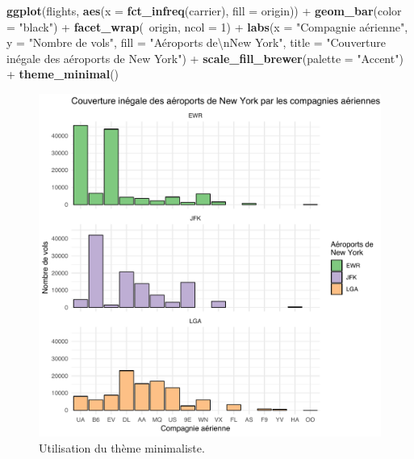 \documentclass[
  a4paper,
]{article}
\newenvironment{Shaded}{\begin{snugshade}}{\end{snugshade}}
\newcommand{\CharTok}[1]{\textcolor[rgb]{0.57,0.30,0.62}{#1}}
\newcommand{\DataTypeTok}[1]{\textcolor[rgb]{0.00,0.34,0.68}{#1}}
\newcommand{\DecValTok}[1]{\textcolor[rgb]{0.69,0.50,0.00}{#1}}
\newcommand{\KeywordTok}[1]{\textcolor[rgb]{0.12,0.11,0.11}{\textbf{#1}}}
\newcommand{\NormalTok}[1]{\textcolor[rgb]{0.12,0.11,0.11}{#1}}
\newcommand{\OperatorTok}[1]{\textcolor[rgb]{0.12,0.11,0.11}{#1}}
\newcommand{\StringTok}[1]{\textcolor[rgb]{0.75,0.01,0.01}{#1}}
\begin{document}
\begin{Shaded}
\begin{Highlighting}[]
\KeywordTok{ggplot}\NormalTok{(flights, }\KeywordTok{aes}\NormalTok{(}\DataTypeTok{x =} \KeywordTok{fct_infreq}\NormalTok{(carrier), }\DataTypeTok{fill =}\NormalTok{ origin)) }\OperatorTok{+}
\StringTok{  }\KeywordTok{geom_bar}\NormalTok{(}\DataTypeTok{color =} \StringTok{"black"}\NormalTok{) }\OperatorTok{+}
\StringTok{  }\KeywordTok{facet_wrap}\NormalTok{(}\OperatorTok{~}\NormalTok{origin, }\DataTypeTok{ncol =} \DecValTok{1}\NormalTok{) }\OperatorTok{+}
\StringTok{  }\KeywordTok{labs}\NormalTok{(}\DataTypeTok{x =} \StringTok{"Compagnie aérienne"}\NormalTok{,}
       \DataTypeTok{y =} \StringTok{"Nombre de vols"}\NormalTok{,}
       \DataTypeTok{fill =} \StringTok{"Aéroports de}\CharTok{\textbackslash{}n}\StringTok{New York"}\NormalTok{,}
       \DataTypeTok{title =} \StringTok{"Couverture inégale des aéroports de New York"}\NormalTok{) }\OperatorTok{+}
\StringTok{  }\KeywordTok{scale_fill_brewer}\NormalTok{(}\DataTypeTok{palette =} \StringTok{"Accent"}\NormalTok{) }\OperatorTok{+}
\StringTok{  }\KeywordTok{theme_minimal}\NormalTok{()}
\end{Highlighting}
\end{Shaded}

\begin{figure}[htpb]

{\centering \includegraphics[width=0.9\linewidth]{figure/thememinimal-1} 

}

\caption{Utilisation du thème minimaliste.}\label{fig:thememinimal}
\end{figure}
\end{document}
